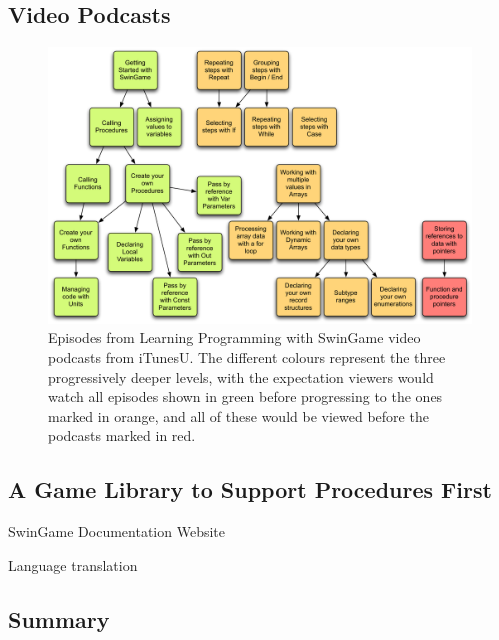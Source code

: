 


\subsection{Video Podcasts} %
\label{sub:vodcasts}



\begin{figure}[thb]
  \centering
  \includegraphics[width=\textwidth]{PodCasts1}
  \caption{Episodes from Learning Programming with SwinGame video podcasts from iTunesU. The different colours represent the three progressively deeper levels, with the expectation viewers would watch all episodes shown in green before progressing to the ones marked in orange, and all of these would be viewed before the podcasts marked in red.}
  \label{fig:podcasts}
\end{figure}



\subsection{A Game Library to Support Procedures First} %
\label{sec:swingame}

SwinGame Documentation Website

Language translation




\subsection{Summary} %
\label{sub:arcana_summary}




